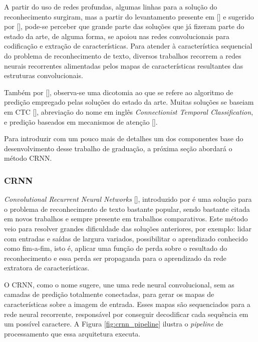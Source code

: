 A partir do uso de redes profundas, algumas linhas para a solução do reconhecimento surgiram, mas a partir do levantamento presente em [] 
e sugerido por [], pode-se perceber que grande parte das soluções que já fizeram parte do estado da arte, de alguma forma, se apoiou 
nas redes convolucionais para codificação e extração de características.
Para atender à característica sequencial do problema de reconhecimento de texto, diversos trabalhos recorrem a redes neurais recorrentes alimentadas pelos 
mapas de características resultantes das estruturas convolucionais.

Também por [], observa-se uma dicotomia ao que se refere ao algoritmo de predição empregado pelas soluções do estado da arte. 
Muitas soluções se baseiam em CTC [], abreviação do nome em inglês \textit{Connectionist Temporal Classification}, e predição baseados em 
mecanismos de atenção [].

Para introduzir com um pouco mais de detalhes um dos componentes base do desenvolvimento desse trabalho de graduação, a próxima seção abordará o método CRNN.


\subsubsection{CRNN} \label{crnn}
\textit{Convolutional Recurrent Neural Networks} [], introduzido por \citeauthor{CRNN} é uma solução para o problema de reconhecimento 
de texto bastante popular, sendo bastante citada em novos trabalhos e sempre presente em trabalhos comparativos. Este método veio para resolver grandes 
dificuldade das soluções anteriores, por exemplo: lidar com entradas e saídas de largura variados, possibilitar o aprendizado conhecido como fim-a-fim, 
isto é, aplicar uma função de perda sobre o resultado do reconhecimento e essa perda ser propaganda para o aprendizado da rede extratora de características.

O CRNN, como o nome sugere, une uma rede neural convolucional, sem as camadas de predição totalmente conectadas, para gerar os mapas de características 
sobre a imagem de entrada. Esses mapas são sequenciados para a rede neural recorrente, responsável por conseguir decodificar cada sequência em um possível 
caractere. A Figura \ref{fig:crnn_pipeline} ilustra o \textit{pipeline} de processamento que essa arquitetura executa.

